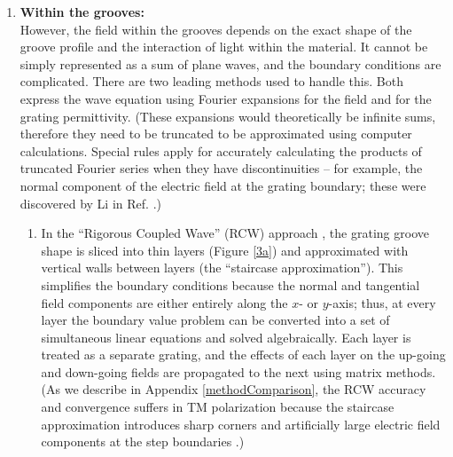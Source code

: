 \begin{enumerate}
\item \textbf{Within the grooves:}\\
However, the field within the grooves depends on the exact shape of the groove profile and the interaction of light within the material.  It cannot be simply represented as a sum of plane waves, and the boundary conditions are complicated.  There are two leading methods used to handle this.  Both express the wave equation using Fourier expansions for the field and for the grating permittivity.  (These expansions would theoretically be infinite sums, therefore they need to be truncated to be approximated using computer calculations.  Special rules apply for accurately calculating the products  of truncated Fourier series when they have discontinuities -- for example, the normal component of the electric field at the grating boundary; these were discovered by Li in Ref. \cite{Li96b}.)
\begin{enumerate} 
	\item In the ``Rigorous Coupled Wave'' (RCW) approach \cite{Moh81} \cite{Moh95}, the grating groove shape is sliced into thin layers (Figure \ref{3a}) and approximated with vertical walls between layers (the ``staircase approximation'').  This simplifies the boundary conditions because the normal and tangential field components are either entirely along the $x$- or $y$-axis; thus, at every layer the boundary value problem can be converted into a set of simultaneous linear equations and solved algebraically.  Each layer is treated as a separate grating, and the effects of each layer on the up-going and down-going fields are propagated to the next using matrix methods.  (As we describe in Appendix \ref{methodComparison}, the RCW accuracy and convergence suffers in TM polarization because the staircase approximation introduces sharp corners and artificially large electric field components at the step boundaries \cite{Pop02}.)
	

\end{enumerate}
\end{enumerate}
